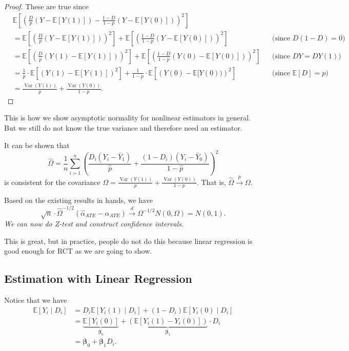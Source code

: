 \documentclass[11pt,a4paper]{amsart}
\theoremstyle{plain}
\theoremstyle{definition}
\begin{document}
\begin{proof}
	 These are true since
	 \[	\begin{aligned}
	 	&\mathbb{E}\left[\left(\frac{D}{p}(Y-\mathbb{E}[Y(1)])-\frac{1-D}{1-p}(Y-\mathbb{E}[Y(0)])\right)^{2}\right] \\
	 	&=\mathbb{E}\left[\left(\frac{D}{p}(Y-\mathbb{E}[Y(1)])\right)^{2}\right] +	\mathbb{E}\left[\left(\frac{1-D}{1-p}(Y-\mathbb{E}[Y(0)])\right)^{2}\right] &&\text{(since $D(1-D)=0$)} \\
	 	&=\mathbb{E}\left[\left(\frac{D}{p}(Y(1)-\mathbb{E}[Y(1)])\right)^{2}\right] +	\mathbb{E}\left[\left(\frac{1-D}{1-p}(Y(0)-\mathbb{E}[Y(0)])\right)^{2}\right] &&\text{(since $DY=DY(1)$)}\\
	 	&= \frac{1}{p} \cdot \mathbb{E}\left[\left(Y(1)-\mathbb{E}[Y(1)]\right)^{2}\right] +	\frac{1}{1-p} \cdot \mathbb{E}\left[\left(Y(0)-\mathbb{E}[Y(0))\right)^{2}\right] &&\text{(since $\mathbb{E}[D]=p$)}\\
	 	&= \frac{\operatorname{Var}(Y(1))}{p} + \frac{\operatorname{Var}(Y(0))}{1-p}.
	 	 \end{aligned}	\]
	\end{proof}
	This is how we show asymptotic normality for nonlinear estimators in general. But we still do not know the true variance and therefore need an estimator.\par 
	 It can be shown that
	\[	\widehat{\Omega}=\frac{1}{n} \sum_{i=1}^{n}\left(\frac{D_{i}\left(Y_{i}-\bar{Y}_{1}\right)}{\widehat{p}}+\frac{\left(1-D_{i}\right)\left(Y_{i}-\bar{Y}_{0}\right)}{1-\widehat{p}}\right)^{2}	\]
	is consistent for the covariance $\Omega  = \frac{\operatorname{Var}(Y(1))}{p} + \frac{\operatorname{Var}(Y(0))}{1-p}$. That is, $\hat{\Omega} \stackrel{p}{\longrightarrow} \Omega$.\par
	Based on the existing results in hands, we have 
	\[	\sqrt{n}\cdot \widehat{\Omega}^{-1 / 2}\left(\widehat{\alpha}_{ATE}-\alpha_{A T E}\right) \stackrel{d}{\longrightarrow}  \Omega^{-1/2}N(0,\Omega) = N(0,1).	\]
	\emph{We can now do Z-test and construct conﬁdence intervals.}\par 
	This is great, but in practice, people do not do this because linear regression is good enough for RCT as we are going to show. 
	
\subsection{Estimation with Linear Regression}\hfill\par 
	Notice that we have 
	\[	\begin{aligned}
	\mathbb{E}\left[Y_{i} \mid D_{i}\right] &=D_{i} \mathbb{E}\left[Y_{i}(1) \mid D_{i}\right]+\left(1-D_{i}\right) \mathbb{E}\left[Y_{i}(0) \mid D_{i}\right] \\
	&=\underbrace{\mathbb{E}\left[Y_{i}(0)\right]}_{\boldsymbol{\beta}_{0}}+\underbrace{\left(\mathbb{E}\left[Y_{i}(1)-Y_{i}(0)\right]\right)}_{\boldsymbol{\beta}_{1}} \cdot D_{i} \\
	&=\boldsymbol{\beta}_{0}+\boldsymbol{\beta}_{1} D_{i} .
	\end{aligned}	\]
	
\end{document}
